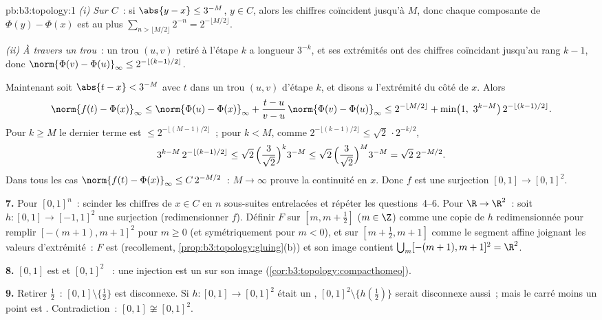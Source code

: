 \begin{solution}{pb:b3:topology:1}
\emph{(i) Sur $C$}~: si $\abs{y - x} \leq 3^{-M}$, $y \in C$,
alors les chiffres coïncident jusqu'à $M$, donc chaque
composante de $\Phi(y) - \Phi(x)$ est au plus $\sum_{n >
\lfloor M/2\rfloor} 2^{-n} = 2^{-\lfloor M/2\rfloor}$.

\emph{(ii) À travers un trou}~: un trou $(u,v)$ retiré à
l'étape $k$ a longueur $3^{-k}$, et ses extrémités ont des
chiffres coïncidant jusqu'au rang $k - 1$, donc
$\norm{\Phi(v) - \Phi(u)}_\infty \leq 2^{-\lfloor
(k-1)/2\rfloor}$.

Maintenant soit $\abs{t - x} < 3^{-M}$ avec $t$ dans un trou
$(u, v)$ d'étape $k$, et disons $u$ l'extrémité du côté de
$x$. Alors
\[
\norm{f(t) - \Phi(x)}_\infty
\leq \norm{\Phi(u) - \Phi(x)}_\infty
+ \frac{t - u}{v - u}\,\norm{\Phi(v) - \Phi(u)}_\infty
\leq 2^{-\lfloor M/2\rfloor} + \min\bigl(1,\ 3^{k - M}\bigr)\,
2^{-\lfloor(k-1)/2\rfloor} .
\]
Pour $k \geq M$ le dernier terme est $\leq 2^{-\lfloor(M-1)/2
\rfloor}$~; pour $k < M$, comme $2^{-\lfloor(k-1)/2\rfloor}
\leq \sqrt2\,\cdot 2^{-k/2}$,
\[
3^{k-M}\,2^{-\lfloor(k-1)/2\rfloor}
\leq \sqrt2\,\Bigl(\frac{3}{\sqrt2}\Bigr)^{k} 3^{-M}
\leq \sqrt2\,\Bigl(\frac{3}{\sqrt2}\Bigr)^{M} 3^{-M}
= \sqrt2\; 2^{-M/2}.
\]
Dans tous les cas $\norm{f(t) - \Phi(x)}_\infty \leq
C\,2^{-M/2}$~: $M \to \infty$ prouve la continuité en $x$.
Donc $f$ est une surjection  $[0,1] \to [0,1]^2$.

\textbf{7.} Pour $[0,1]^n$~: scinder les chiffres de $x \in C$
en $n$ sous-suites entrelacées et répéter les questions~4--6.
Pour $\R \to \R^2$~: soit $h \colon [0,1] \to [-1,1]^2$ une
surjection  (redimensionner $f$). Définir $F$ sur
$[m, m + \frac12]$ ($m \in \Z$) comme une copie de $h$
redimensionnée pour remplir $[-(m+1), m+1]^2$ pour $m \geq 0$
(et symétriquement pour $m < 0$), et sur $[m + \frac12, m +
1]$ comme le segment affine joignant les valeurs d'extrémité~:
$F$ est  (recollement,
\cref{prop:b3:topology:gluing}(b)) et son image contient
$\bigcup_m [-(m+1), m+1]^2 = \R^2$.

\textbf{8.} $[0,1]$ est  et $[0,1]^2$ ~: une
injection  est un  sur son image
(\cref{cor:b3:topology:compacthomeo}).

\textbf{9.} Retirer $\frac12$~: $[0,1]\setminus\{\frac12\}$
est disconnexe. Si $h \colon [0,1] \to [0,1]^2$ était un
, $[0,1]^2\setminus\{h(\frac12)\}$ serait
disconnexe aussi~; mais le carré moins un point est . Contradiction~: $[0,1] \not\cong [0,1]^2$.


\end{solution}
